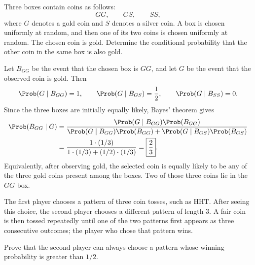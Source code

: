     \begin{expectedproblem}
        Three boxes contain coins as follows:
        \[
            GG,\qquad GS,\qquad SS,
        \]
        where $G$ denotes a gold coin and $S$ denotes a silver coin. A box is
        chosen uniformly at random, and then one of its two coins is chosen
        uniformly at random. The chosen coin is gold. Determine the
        conditional probability that the other coin in the same box is also
        gold.
    \end{expectedproblem}

    \begin{solution}
        Let $B_{GG}$ be the event that the chosen box is $GG$, and let $G$ be
        the event that the observed coin is gold. Then
        \[
            \Prob(G\mid B_{GG})=1,
            \qquad
            \Prob(G\mid B_{GS})=\frac12,
            \qquad
            \Prob(G\mid B_{SS})=0.
        \]
        Since the three boxes are initially equally likely, Bayes' theorem
        gives
        \[
            \begin{aligned}
                \Prob(B_{GG}\mid G)
                &=
                \frac{
                    \Prob(G\mid B_{GG})\Prob(B_{GG})
                }{
                    \Prob(G\mid B_{GG})\Prob(B_{GG})
                    +
                    \Prob(G\mid B_{GS})\Prob(B_{GS})
                }\\
                &=
                \frac{1\cdot(1/3)}
                {1\cdot(1/3)+(1/2)\cdot(1/3)}
                =
                \boxed{\frac23}.
            \end{aligned}
        \]
        Equivalently, after observing gold, the selected coin is equally
        likely to be any of the three gold coins present among the boxes.
        Two of those three coins lie in the $GG$ box.
    \end{solution}

    \begin{expectedproblem}
        The first player chooses a pattern of three coin tosses, such as
        $\mathrm{HHT}$. After seeing this choice, the second player chooses a
        different pattern of length $3$. A fair coin is then tossed repeatedly
        until one of the two patterns first appears as three consecutive
        outcomes; the player who chose that pattern wins.

        Prove that the second player can always choose a pattern whose winning
        probability is greater than $1/2$.
    \end{expectedproblem}

